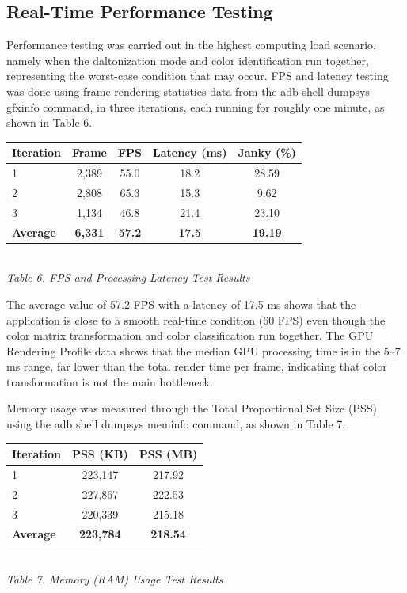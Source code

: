 \subsection{Real-Time Performance Testing}

Performance testing was carried out in the highest computing load scenario, namely when the daltonization mode and color identification run together, representing the worst-case condition that may occur. FPS and latency testing was done using frame rendering statistics data from the adb shell dumpsys gfxinfo command, in three iterations, each running for roughly one minute, as shown in Table 6.

\begin{table}[H]
  \centering
  {\footnotesize
  \begin{tabular}{|l|c|c|c|c|}
    \hline
    \textbf{Iteration} & \textbf{Frame} & \textbf{FPS} & \textbf{Latency (ms)} & \textbf{Janky (\%)} \\
    \hline
    1 & 2,389 & 55.0 & 18.2 & 28.59 \\ \hline
    2 & 2,808 & 65.3 & 15.3 & 9.62 \\ \hline
    3 & 1,134 & 46.8 & 21.4 & 23.10 \\ \hline
    \textbf{Average} & \textbf{6,331} & \textbf{57.2} & \textbf{17.5} & \textbf{19.19} \\ \hline
  \end{tabular}}\\[0.3em]
  {\footnotesize\textit{Table 6. FPS and Processing Latency Test Results}}
\end{table}

The average value of 57.2 FPS with a latency of 17.5 ms shows that the application is close to a smooth real-time condition (60 FPS) even though the color matrix transformation and color classification run together. The GPU Rendering Profile data shows that the median GPU processing time is in the 5--7 ms range, far lower than the total render time per frame, indicating that color transformation is not the main bottleneck.

Memory usage was measured through the Total Proportional Set Size (PSS) using the adb shell dumpsys meminfo command, as shown in Table 7.

\begin{table}[H]
  \centering
  {\footnotesize
  \begin{tabular}{|l|c|c|}
    \hline
    \textbf{Iteration} & \textbf{PSS (KB)} & \textbf{PSS (MB)} \\
    \hline
    1 & 223,147 & 217.92 \\ \hline
    2 & 227,867 & 222.53 \\ \hline
    3 & 220,339 & 215.18 \\ \hline
    \textbf{Average} & \textbf{223,784} & \textbf{218.54} \\ \hline
  \end{tabular}}\\[0.3em]
  {\footnotesize\textit{Table 7. Memory (RAM) Usage Test Results}}
\end{table}

